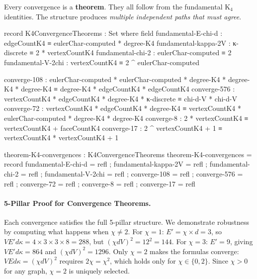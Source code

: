\documentclass[11pt,a4paper]{book}
\begin{document}
Every convergence is a \textbf{theorem}. They all follow from
the fundamental K$_4$ identities. The structure produces 
\emph{multiple independent paths that must agree}.

\begin{code}
record K4ConvergenceTheorems : Set where
  field
    fundamental-E-chi-d   : edgeCountK4 ≡ eulerChar-computed * degree-K4
    fundamental-kappa-2V  : κ-discrete ≡ 2 * vertexCountK4
    fundamental-chi-2     : eulerChar-computed ≡ 2
    fundamental-V-2chi    : vertexCountK4 ≡ 2 ^ eulerChar-computed
    
    converge-108 : eulerChar-computed * eulerChar-computed * degree-K4 * degree-K4 * degree-K4 
                 ≡ degree-K4 * edgeCountK4 * edgeCountK4
    converge-576 : vertexCountK4 * edgeCountK4 * degree-K4 * κ-discrete 
                 ≡ chi-d-V * chi-d-V
    converge-72  : vertexCountK4 * edgeCountK4 * degree-K4 
                 ≡ vertexCountK4 * eulerChar-computed * degree-K4 * degree-K4
    converge-8   : 2 * vertexCountK4 ≡ vertexCountK4 + faceCountK4
    converge-17  : 2 ^ vertexCountK4 + 1 ≡ vertexCountK4 * vertexCountK4 + 1

theorem-K4-convergences : K4ConvergenceTheorems
theorem-K4-convergences = record
  { fundamental-E-chi-d  = refl
  ; fundamental-kappa-2V = refl
  ; fundamental-chi-2    = refl
  ; fundamental-V-2chi   = refl
  ; converge-108 = refl
  ; converge-576 = refl
  ; converge-72  = refl
  ; converge-8   = refl
  ; converge-17  = refl
  }
\end{code}

\paragraph{5-Pillar Proof for Convergence Theorems.}

Each convergence satisfies the full 5-pillar structure. We demonstrate robustness by computing 
what happens when $\chi \neq 2$. For $\chi = 1$: $E' = \chi \times d = 3$, so 
$V E' d \kappa = 4 \times 3 \times 3 \times 8 = 288$, but $(\chi d V)^2 = 12^2 = 144$. 
For $\chi = 3$: $E' = 9$, giving $V E' d \kappa = 864$ and $(\chi d V)^2 = 1296$. 
Only $\chi = 2$ makes the formulas converge: $VEd\kappa = (\chi dV)^2$ requires $2\chi = \chi^2$, 
which holds only for $\chi \in \{0, 2\}$. Since $\chi > 0$ for any graph, $\chi = 2$ is uniquely selected.
\end{document}
